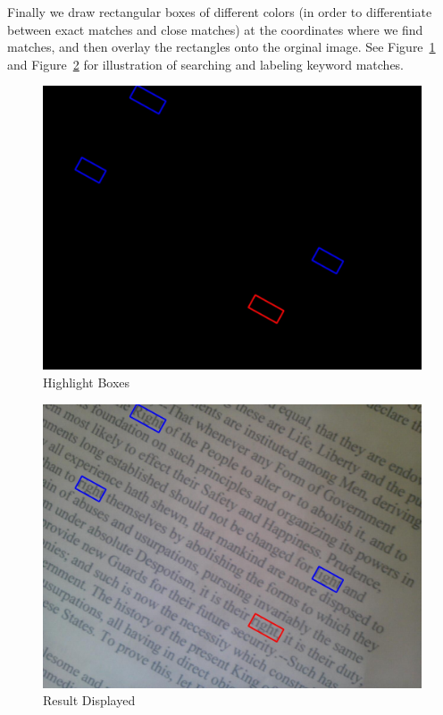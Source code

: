 \documentclass[conference]{IEEEtran}
\begin{document}
Finally we draw rectangular boxes of different colors (in order to differentiate between exact matches and close matches) at the coordinates where we find matches, and then overlay the rectangles onto the orginal image.  See Figure~\ref{boxes_overlay} and Figure~\ref{result_image} for illustration of searching and labeling keyword matches.

\begin{figure}
\center
\includegraphics[scale=0.15]{bb_mask_inv_cropped.jpg}
\caption{Highlight Boxes}
\label{boxes_overlay}
\end{figure}

\begin{figure}
\center
\includegraphics[scale=0.15]{result_image.jpg}
\caption{Result Displayed}
\label{result_image}
\end{figure}
\end{document}
